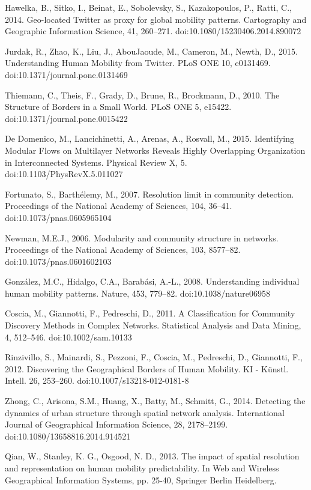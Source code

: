 \documentclass[10pt,letterpaper]{article}
\begin{document}
\begin{thebibliography}{10}
Hawelka, B., Sitko, I., Beinat, E., Sobolevsky, S., Kazakopoulos, P., Ratti, C., 2014. Geo-located Twitter as proxy for global mobility patterns. Cartography and Geographic Information Science, 41, 260–271. doi:10.1080/15230406.2014.890072

Jurdak, R., Zhao, K., Liu, J., AbouJaoude, M., Cameron, M., Newth, D., 2015. Understanding Human Mobility from Twitter. PLoS ONE 10, e0131469. doi:10.1371/journal.pone.0131469

Thiemann, C., Theis, F., Grady, D., Brune, R., Brockmann, D., 2010. The Structure of Borders in a Small World. PLoS ONE 5, e15422. doi:10.1371/journal.pone.0015422

De Domenico, M., Lancichinetti, A., Arenas, A., Rosvall, M., 2015. Identifying Modular Flows on Multilayer Networks Reveals Highly Overlapping Organization in Interconnected Systems. Physical Review X, 5. doi:10.1103/PhysRevX.5.011027

Fortunato, S., Barthélemy, M., 2007. Resolution limit in community detection. Proceedings of the National Academy of Sciences, 104, 36–41. doi:10.1073/pnas.0605965104

Newman, M.E.J., 2006. Modularity and community structure in networks. Proceedings of the National Academy of Sciences, 103, 8577–82. doi:10.1073/pnas.0601602103

González, M.C., Hidalgo, C.A., Barabási, A.-L., 2008. Understanding individual human mobility patterns. Nature, 453, 779–82. doi:10.1038/nature06958

Coscia, M., Giannotti, F., Pedreschi, D., 2011. A Classification for Community Discovery Methods in Complex Networks. Statistical Analysis and Data Mining, 4, 512–546. doi:10.1002/sam.10133

Rinzivillo, S., Mainardi, S., Pezzoni, F., Coscia, M., Pedreschi, D., Giannotti, F., 2012. Discovering the Geographical Borders of Human Mobility. KI - Künstl. Intell. 26, 253–260. doi:10.1007/s13218-012-0181-8

Zhong, C., Arisona, S.M., Huang, X., Batty, M., Schmitt, G., 2014. Detecting the dynamics of urban structure through spatial network analysis. International Journal of Geographical Information Science, 28, 2178–2199. doi:10.1080/13658816.2014.914521

Qian, W., Stanley, K. G., Osgood, N. D., 2013. The impact of spatial resolution and representation on human mobility predictability. In Web and Wireless Geographical Information Systems,  pp. 25-40, Springer Berlin Heidelberg.


\end{thebibliography}
\end{document}
